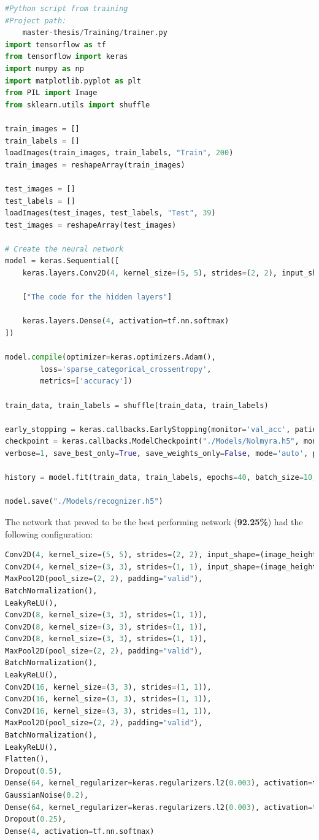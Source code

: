 \begin{lstlisting}[language=python]
#Python script from training
#Project path:
	master-thesis/Training/trainer.py
import tensorflow as tf
from tensorflow import keras
import numpy as np
import matplotlib.pyplot as plt
from PIL import Image
from sklearn.utils import shuffle

train_images = []
train_labels = []
loadImages(train_images, train_labels, "Train", 200)
train_images = reshapeArray(train_images)

test_images = []
test_labels = []
loadImages(test_images, test_labels, "Test", 39)
test_images = reshapeArray(test_images)

# Create the neural network
model = keras.Sequential([
	keras.layers.Conv2D(4, kernel_size=(5, 5), strides=(2, 2), input_shape=(image_height, image_width, number_of_color_channels)),
		
	["The code for the hidden layers"]

	keras.layers.Dense(4, activation=tf.nn.softmax)
])

model.compile(optimizer=keras.optimizers.Adam(),
	    loss='sparse_categorical_crossentropy',
	    metrics=['accuracy'])
	    
train_data, train_labels = shuffle(train_data, train_labels)

early_stopping = keras.callbacks.EarlyStopping(monitor='val_acc', patience=5, verbose=1)
checkpoint = keras.callbacks.ModelCheckpoint("./Models/Nolmyra.h5", monitor='val_acc', 
verbose=1, save_best_only=True, save_weights_only=False, mode='auto', period=1)

history = model.fit(train_data, train_labels, epochs=40, batch_size=10, validation_data=(test_images, test_labels), callbacks=[early_stopping, checkpoint] , verbose=1)

model.save("./Models/recognizer.h5")
\end{lstlisting}

The network that proved to be the best performing network (\textbf{92.25\%}) had the following configuration:

\begin{lstlisting}[language=python]
Conv2D(4, kernel_size=(5, 5), strides=(2, 2), input_shape=(image_height, image_width, number_of_color_channels)),
Conv2D(4, kernel_size=(3, 3), strides=(1, 1), input_shape=(image_height, image_width, number_of_color_channels)),
MaxPool2D(pool_size=(2, 2), padding="valid"),
BatchNormalization(),
LeakyReLU(),
Conv2D(8, kernel_size=(3, 3), strides=(1, 1)),
Conv2D(8, kernel_size=(3, 3), strides=(1, 1)),
Conv2D(8, kernel_size=(3, 3), strides=(1, 1)),
MaxPool2D(pool_size=(2, 2), padding="valid"),
BatchNormalization(),
LeakyReLU(),
Conv2D(16, kernel_size=(3, 3), strides=(1, 1)),
Conv2D(16, kernel_size=(3, 3), strides=(1, 1)),
Conv2D(16, kernel_size=(3, 3), strides=(1, 1)),
MaxPool2D(pool_size=(2, 2), padding="valid"),
BatchNormalization(),
LeakyReLU(),
Flatten(),
Dropout(0.5),
Dense(64, kernel_regularizer=keras.regularizers.l2(0.003), activation=tf.nn.relu),
GaussianNoise(0.2),
Dense(64, kernel_regularizer=keras.regularizers.l2(0.003), activation=tf.nn.relu),
Dropout(0.25),
Dense(4, activation=tf.nn.softmax)
\end{lstlisting}

